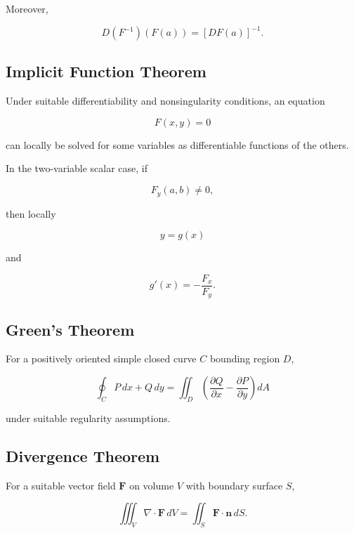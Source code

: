 Moreover,

\[
\boxed{
D(F^{-1})(F(a))
=
[DF(a)]^{-1}.
}
\]

\subsection{Implicit Function Theorem}
\label{subsec:implicit-function-theorem-summary}

Under suitable differentiability and nonsingularity conditions, an equation

\[
F(x,y)=0
\]

can locally be solved for some variables as differentiable functions of the
others.

In the two-variable scalar case, if

\[
F_y(a,b)\neq0,
\]

then locally

\[
y=g(x)
\]

and

\[
\boxed{
g'(x)
=
-\frac{
F_x
}{
F_y
}.
}
\]

\subsection{Green's Theorem}
\label{subsec:greens-theorem-summary}

For a positively oriented simple closed curve \(C\) bounding region \(D\),

\[
\boxed{
\oint_C
P\,dx+Q\,dy
=
\iint_D
\left(
\frac{\partial Q}{\partial x}
-
\frac{\partial P}{\partial y}
\right)
dA
}
\]

under suitable regularity assumptions.

\subsection{Divergence Theorem}
\label{subsec:divergence-theorem-summary}

For a suitable vector field \(\mathbf{F}\) on volume \(V\) with boundary
surface \(S\),

\[
\boxed{
\iiint_V
\nabla\cdot\mathbf{F}
\,dV
=
\iint_S
\mathbf{F}\cdot\mathbf{n}
\,dS.
}
\]

